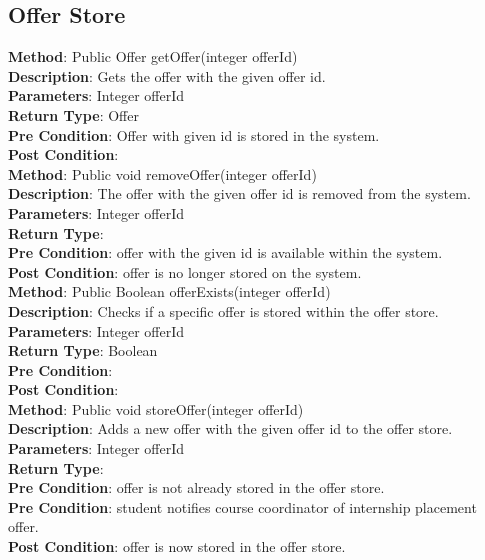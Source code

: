 \documentclass{l3deliverable}
\begin{document}
\subsection{Offer Store}

\textbf{Method}: Public Offer getOffer(integer offerId)\\ 
\textbf{Description}: Gets the offer with the given offer id. \\
\textbf{Parameters}: Integer offerId\\
\textbf{Return Type}: Offer\\
\textbf{Pre Condition}: Offer with given id is stored in the system.\\
\textbf{Post Condition}:\\

\textbf{Method}: Public void removeOffer(integer offerId)\\
\textbf{Description}: The offer with the given offer id is removed from the system. \\
\textbf{Parameters}: Integer offerId \\
\textbf{Return Type}:\\
\textbf{Pre Condition}: offer with the given id is available within the system.\\
\textbf{Post Condition}: offer is no longer stored on the system.\\

\textbf{Method}: Public Boolean offerExists(integer offerId) \\
\textbf{Description}: Checks if a specific offer is stored within the offer store. \\
\textbf{Parameters}: Integer offerId\\
\textbf{Return Type}: Boolean\\
\textbf{Pre Condition}:\\
\textbf{Post Condition}:\\

\textbf{Method}: Public void storeOffer(integer offerId)\\
\textbf{Description}: Adds a new offer with the given offer id to the offer store. \\
\textbf{Parameters}: Integer offerId\\
\textbf{Return Type}:\\
\textbf{Pre Condition}: offer is not already stored in the offer store.\\
\textbf{Pre Condition}: student notifies course coordinator of internship placement offer.\\
\textbf{Post Condition}: offer is now stored in the offer store.\\
\end{document}
